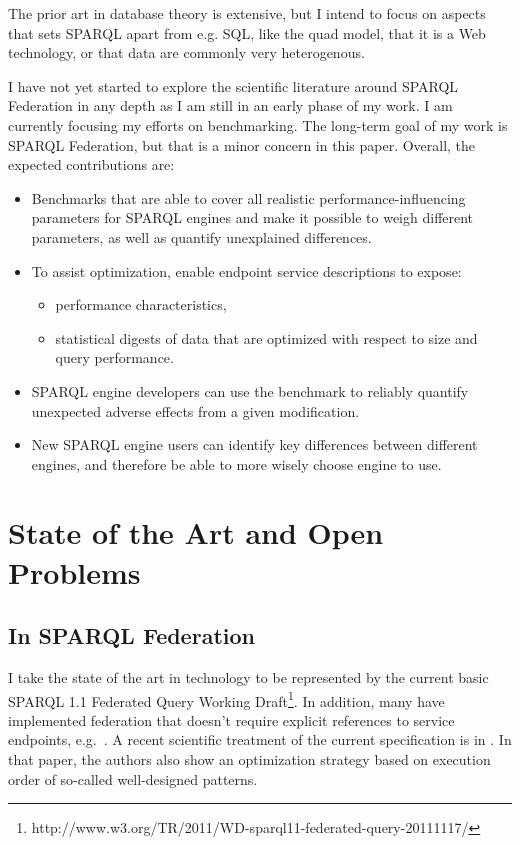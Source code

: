 \documentclass{llncs}
\begin{document}
The prior art in database theory is extensive, but I intend to focus
on aspects that sets SPARQL apart from e.g. SQL, like the quad model,
that it is a Web technology, or that data are commonly very
heterogenous.


I have not yet started to explore the scientific literature around
SPARQL Federation in any depth as I am still in an early phase of my
work. I am currently focusing my efforts on benchmarking. The
long-term goal of my work is SPARQL Federation, but that is a minor
concern in this paper. Overall, the expected contributions are:

\begin{itemize}
\item Benchmarks that are able to cover all realistic
  performance-influencing parameters for SPARQL engines and make it
  possible to weigh different parameters, as well as quantify
  unexplained differences. 

\item To assist optimization, enable endpoint service descriptions to
  expose:
\begin{itemize}
\item performance characteristics,
\item statistical digests of data that are optimized with respect to
  size and query performance.
\end{itemize}
\item SPARQL engine developers can use the benchmark to reliably
  quantify unexpected adverse effects from a given modification.
\item New SPARQL engine users can identify key differences between
  different engines, and therefore be able to more wisely choose
  engine to use.
\end{itemize}


\section{State of the Art and Open Problems}

\subsection{In SPARQL Federation}

I take the state of the art in technology to be represented by the
current basic SPARQL 1.1 Federated Query Working
Draft\footnote{http://www.w3.org/TR/2011/WD-sparql11-federated-query-20111117/}. In
addition, many have implemented federation that doesn't require 
explicit references to service endpoints, e.g.~\cite{springerlink:10.1007/978-3-642-25073-6-38}.
A recent scientific treatment of the current specification is in
\cite{springerlink:10.1007/978-3-642-21064-8-1}. In that paper, the
authors also show an optimization strategy based on execution order of
so-called well-designed patterns.
\end{document}
